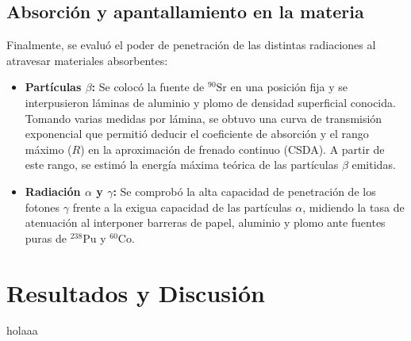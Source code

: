 \documentclass[9pt,a4paper,twocolumn,twoside]{rho-class/rho}
\begin{document}
\subsection{Absorción y apantallamiento en la materia}
Finalmente, se evaluó el poder de penetración de las distintas radiaciones al atravesar materiales absorbentes:
\begin{itemize}
    \item \textbf{Partículas $\beta$:} Se colocó la fuente de $^{90}\text{Sr}$ en una posición fija y se interpusieron láminas de aluminio y plomo de densidad superficial conocida. %
    Tomando varias medidas por lámina, se obtuvo una curva de transmisión exponencial que permitió deducir el coeficiente de absorción y el rango máximo ($R$) en la aproximación de frenado continuo (CSDA). %
    A partir de este rango, se estimó la energía máxima teórica de las partículas $\beta$ emitidas. %
    \item \textbf{Radiación $\alpha$ y $\gamma$:} Se comprobó la alta capacidad de penetración de los fotones $\gamma$ frente a la exigua capacidad de las partículas $\alpha$, midiendo la tasa de atenuación al interponer barreras de papel, aluminio y plomo ante fuentes puras de $^{238}\text{Pu}$ y $^{60}\text{Co}$. %
\end{itemize}


\section{Resultados y Discusión}
holaaa
\end{document}
